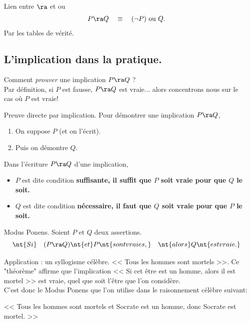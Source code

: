 \documentclass[11pt]{article}
\begin{document}
\begin{thm}{Lien entre $\ra$ et ou}{}
    \begin{equation*}
        P\ra Q \quad \equiv \quad (\lnot P) \text{ ou } Q.
    \end{equation*}
    \tcblower
    Par les tables de vérité.
\end{thm}

\subsection{L'implication dans la pratique.}

Comment \emph{prouver} une implication $P\ra Q$ ?\\
Par définition, si $P$ est fausse, $P\ra Q$ est vraie... alors concentrons nous sur le cas où $P$ est vraie!
\vspace*{0.3cm}

\begin{meth}{Preuve directe par implication.}{}
    Pour démontrer une implication $P\ra Q$,
    \begin{enumerate}
        \item On suppose $P$ (et on l'écrit).
        \item Puis on démontre $Q$.
    \end{enumerate}
\end{meth}

\begin{defi}{}{}
    Dans l'écriture $P\ra Q$ d'une implication,
    \begin{itemize}
        \item $P$ est dite condition \bf{suffisante}, il suffit que $P$ soit vraie pour que $Q$ le soit.
        \item $Q$ est dite condition \bf{nécessaire}, il faut que $Q$ soit vraie pour que $P$ le soit.
    \end{itemize}
\end{defi}

\begin{prop}{Modus Ponens.}{}
    Soient $P$ et $Q$ deux assertions.
    \begin{equation*}
        \nt{Si} \quad (P \ra Q) \nt{ et } P \nt{ sont vraies,} \quad \nt{alors } Q \nt{ est vraie.}
    \end{equation*}
\end{prop}

\vspace*{-0.8cm}

\begin{ex}{Application : un syllogisme célèbre.}{}
    << Tous les hommes sont mortels >>. Ce "théorème" affirme que l'implication << Si cet être est un homme, alors il est mortel >> est vraie, quel que soit l'être que l'on considère.\\
    C'est donc le Modus Ponens que l'on utilise dans le raisonnement célèbre suivant:
    \begin{center}
        << Tous les hommes sont mortels et Socrate est un homme, donc Socrate est mortel. >>
    \end{center}
\end{ex}
\end{document}
